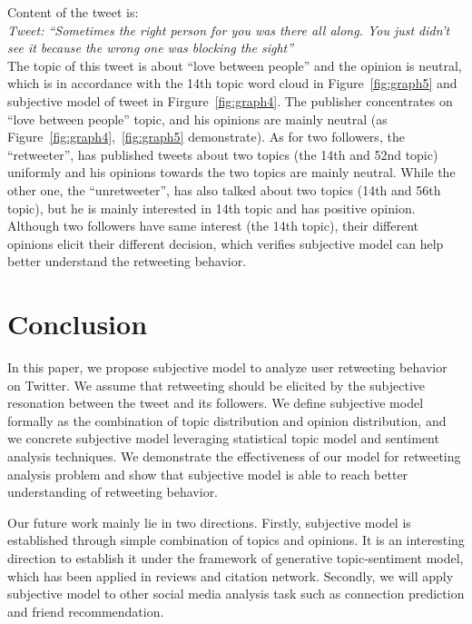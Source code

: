 \documentclass{acm_proc_article-sp}
\begin{document}
Content of the tweet is:\\
\textit{Tweet: ``Sometimes the right person for you was there all along. You just didn’t see it because the wrong one was blocking the sight''} \\
The topic of this tweet is about ``love between people'' and the opinion is neutral, which is in accordance with the 14th topic word cloud in Figure~\ref{fig:graph5} and subjective model of tweet in Firgure~\ref{fig:graph4}.
The publisher concentrates on ``love between people'' topic, and his opinions are mainly neutral (as Figure~\ref{fig:graph4},~\ref{fig:graph5} demonstrate).
As for two followers, the ``retweeter'', has published tweets about two topics (the 14th and 52nd topic) uniformly and his opinions towards the two topics are mainly neutral.
While the other one, the ``unretweeter'', has also talked about two topics (14th and 56th topic), but he is mainly interested in 14th topic and has positive opinion.
Although two followers have same interest (the 14th topic), their different opinions elicit their different decision, which verifies subjective model can help better understand the retweeting behavior.

\section{Conclusion}
In this paper, we propose subjective model to analyze user retweeting behavior on Twitter. We assume that retweeting should be elicited by the subjective resonation between the tweet and its followers. 
We define subjective model formally as the combination of topic distribution and opinion distribution, and we concrete subjective model leveraging statistical topic model and sentiment analysis techniques.
We demonstrate the effectiveness of our model for retweeting analysis problem and show that subjective model is able to reach better understanding of retweeting behavior. 

Our future work mainly lie in two directions.
Firstly, subjective model is established through simple combination of topics and opinions. It is an interesting direction to establish it under the framework of generative topic-sentiment model, which has been applied in reviews and citation network.
Secondly, we will apply subjective model to other social media analysis task such as connection prediction and friend recommendation.


\end{document}
